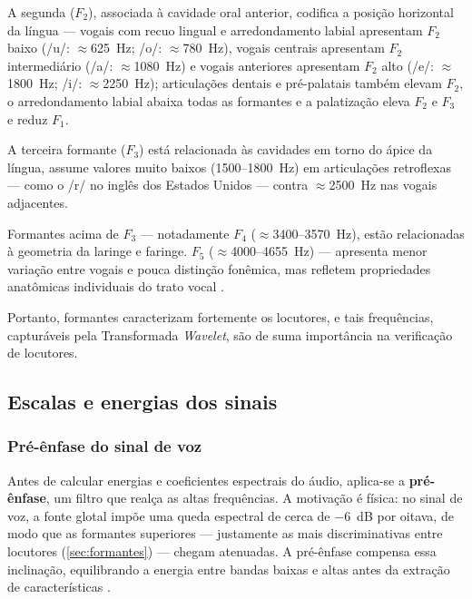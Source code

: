 			\par A segunda ($F_2$), associada à cavidade oral anterior, codifica a posição horizontal da língua — vogais com recuo lingual e arredondamento labial apresentam $F_2$ baixo (/u/: $\approx$625~Hz; /o/: $\approx$780~Hz), vogais centrais apresentam $F_2$ intermediário (/a/: $\approx$1080~Hz) e vogais anteriores apresentam $F_2$ alto (/e/: $\approx$1800~Hz; /i/: $\approx$2250~Hz); articulações dentais e pré-palatais também elevam $F_2$, o arredondamento labial abaixa todas as formantes e a palatização eleva $F_2$ e $F_3$ e reduz $F_1$. 
			
			\par A terceira formante ($F_3$) está relacionada às cavidades em torno do ápice da língua, assume valores muito baixos (1500--1800~Hz) em articulações retroflexas — como o /r/ no inglês dos Estados Unidos — contra $\approx$2500~Hz nas vogais adjacentes.

			\par Formantes acima de $F_3$ — notadamente $F_4$ ($\approx$3400--3570~Hz), estão relacionadas à geometria da laringe e faringe. $F_5$ ($\approx$4000--4655~Hz) — apresenta menor variação entre vogais e pouca distinção fonêmica, mas refletem propriedades anatômicas individuais do trato vocal \cite{fant1960acoustic}. 
			
			\par Portanto, formantes caracterizam fortemente os locutores, e tais frequências, capturáveis pela Transformada \textit{Wavelet}, são de suma importância na verificação de locutores.
				
		\subsection{Escalas e energias dos sinais}

			\subsubsection{Pré-ênfase do sinal de voz}
				\par Antes de calcular energias e coeficientes espectrais do áudio, aplica-se a \textbf{pré-ênfase}, um filtro que realça as altas frequências. A motivação é física: no sinal de voz, a fonte glotal impõe uma queda espectral de cerca de $-6$~dB por oitava, de modo que as formantes superiores --- justamente as mais discriminativas entre locutores (\autoref{sec:formantes}) --- chegam atenuadas. A pré-ênfase compensa essa inclinação, equilibrando a energia entre bandas baixas e altas antes da extração de características \cite{rabiner1993fundamentals}.

